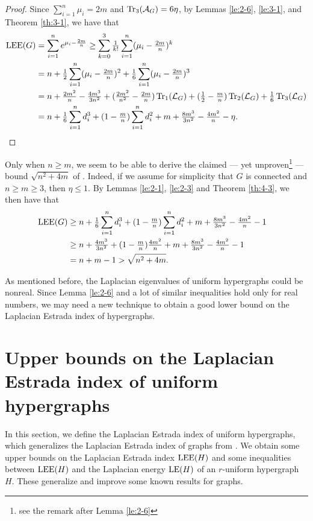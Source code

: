 \documentclass[11pt]{article}
\def\LEE{\mathop{\rm LEE }\nolimits}
\def\LE{\mathop{\rm LE }\nolimits}
\def\Tr{\mathop{\rm Tr }\nolimits}
\begin{document}
\begin{proof}  Since $\sum\limits_{i=1}^{n}\mu_{i}=2m$ and $\Tr_3(\mathcal{A}_G)=6\eta$, by Lemmas \ref{le:2-6}, \ref{le:3-1}, and Theorem \ref{th:3-1}, we have that
\begin{align*}
\LEE(G)&=\sum_{i=1}^{n}e^{\mu_{i}-\frac{2m}{n}}
\geq\sum_{k=0}^{3}\tfrac{1}{k!}\sum\limits_{i=1}^{n}(\mu_{i}-\tfrac{2m}{n})^{k}\\
&=n+\tfrac{1}{2}\sum\limits_{i=1}^{n}(\mu_{i}-\tfrac{2m}{n})^{2}+\tfrac{1}{6}\sum\limits_{i=1}^{n}(\mu_{i}-\tfrac{2m}{n})^{3}\\
&=n+\tfrac{2m^2}{n}-\tfrac{4m^3}{3n^2}+(\tfrac{2m^2}{n^2}-\tfrac{2m}{n})\Tr_1(\mathcal{L}_G)+(\tfrac{1}{2}-\tfrac{m}{n})\Tr_2(\mathcal{L}_G)+\tfrac{1}{6}\Tr_3(\mathcal{L}_G)\\
&=n+\tfrac{1}{6}\sum_{i=1}^{n}d_{i}^{3}+(1-\tfrac{m}{n})\sum_{i=1}^{n}d_{i}^{2}+m+\tfrac{8m^{3}}{3n^{2}}-\tfrac{4m^{2}}{n}-\eta.
\end{align*}
\end{proof}

 Only when $n \geq m$, we seem to be able to derive the claimed --- yet unproven\footnote{see the remark after Lemma \ref{le:2-6}} --- bound $\sqrt{n^2+4m}$ of \cite{LSC}. Indeed, if we assume for simplicity that $G$ is connected and $n\geq m\geq 3$, then $\eta\leq 1.$ By Lemmas \ref{le:2-1}, \ref{le:2-3} and Theorem \ref{th:4-3}, we then have that
\begin{align*}
\LEE(G)& \geq n+\tfrac{1}{6}\sum_{i=1}^{n}d_{i}^{3}+(1-\tfrac{m}{n})\sum_{i=1}^{n}d_{i}^{2}+m+\tfrac{8m^{3}}{3n^{2}}-\tfrac{4m^{2}}{n}-1\cr
&\geq n+\tfrac{4m^{3}}{3n^{2}}+(1-\tfrac{m}{n})\tfrac{4m^{2}}{n}+m+\tfrac{8m^{3}}{3n^{2}}-\tfrac{4m^{2}}{n}-1\cr
&=n+m-1> \sqrt{n^{2}+4m}.
\end{align*}

As mentioned before, the Laplacian eigenvalues of uniform hypergraphs could be nonreal. Since Lemma \ref{le:2-6} and a lot of similar inequalities hold only for real numbers, we may need a new technique to obtain a good lower bound on the Laplacian Estrada index of hypergraphs.

\section{Upper bounds on the Laplacian Estrada index of uniform hypergraphs}
\label{sec:ch-inco}
In this section,  we define the Laplacian Estrada index of uniform hypergraphs, which generalizes the Laplacian Estrada index of graphs from \cite{LSC}. We obtain some upper bounds on the Laplacian Estrada index $\LEE(H)$ and some inequalities between $\LEE(H)$ and the Laplacian energy $\LE(H)$ of an $r$-uniform hypergraph $H.$ These generalize and improve some known results for graphs.
\end{document}
